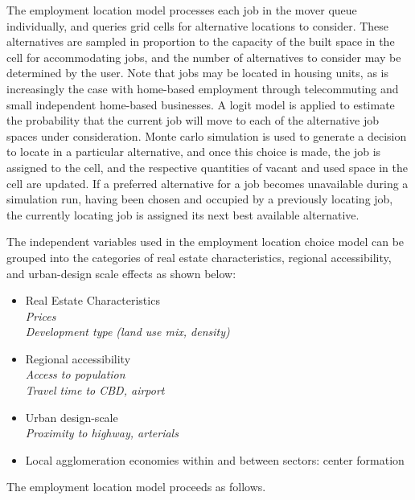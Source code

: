 The employment location model processes each job in the mover
queue individually, and queries grid cells for alternative
locations to consider. These alternatives are sampled in
proportion to the capacity of the built space in the cell for
accommodating jobs, and the number of alternatives to consider may
be determined by the user.  Note that jobs may be located in
housing units, as is increasingly the case with home-based
employment through telecommuting and small independent home-based
businesses.  A logit model is applied to estimate the probability
that the current job will move to each of the alternative job
spaces under consideration.  Monte carlo simulation is used to
generate a decision to locate in a particular alternative, and
once this choice is made, the job is assigned to the cell, and the
respective quantities of vacant and used space in the cell are
updated.  If a preferred alternative for a job becomes unavailable
during a simulation run, having been chosen and occupied by a
previously locating job, the currently locating job is assigned
its next best available alternative.

The independent variables used in the employment location choice
model can be grouped into the categories of real estate
characteristics, regional accessibility, and urban-design scale
effects as shown below:

\begin{itemize}

\item Real Estate Characteristics \\
\emph{Prices} \\
\emph{Development type (land use mix, density)}

\item Regional accessibility \\
\emph{Access to population} \\
\emph{Travel time to CBD, airport}

\item Urban design-scale \\
\emph{Proximity to highway, arterials}

\item Local agglomeration economies within and between sectors: center
formation

\end{itemize}

The employment location model proceeds as follows.

